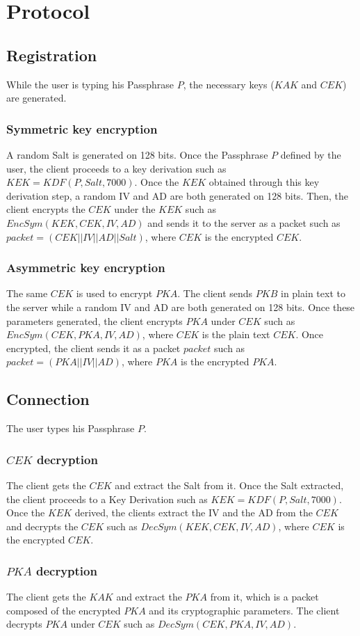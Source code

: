 \documentclass[a4paper,10pt]{article}
\begin{document}
\section{Protocol}
\subsection{Registration}
While the user is typing his Passphrase $P$, the necessary keys ($KAK$ and $CEK$) are generated.
\subsubsection{Symmetric key encryption}
A random Salt is generated on 128 bits. Once the Passphrase $P$ defined by the user, the client proceeds to a key derivation such as $KEK=KDF(P,Salt, 7000)$. Once the $KEK$ obtained through this key derivation step, a random IV and AD are both generated on 128 bits. Then, the client encrypts the $CEK$ under the $KEK$ such as $EncSym(KEK, CEK,IV,AD)$ and sends it to the server as a packet such as $packet=(CEK||IV||AD||Salt)$, where $CEK$ is the encrypted $CEK$.
\subsubsection{Asymmetric key encryption}
The same $CEK$ is used to encrypt $PKA$. The client sends $PKB$ in plain text to the server while a random IV and AD are both generated on 128 bits. Once these parameters generated, the client encrypts $PKA$ under $CEK$ such as $EncSym(CEK, PKA, IV, AD)$, where $CEK$ is the plain text $CEK$. Once encrypted, the client sends it as a packet $packet$ such as $packet=(PKA||IV||AD)$, where $PKA$ is the encrypted $PKA$.

\subsection{Connection}
The user types his Passphrase $P$.

\subsubsection{$CEK$ decryption}
The client gets the $CEK$ and extract the Salt from it. Once the Salt extracted, the client proceeds to a Key Derivation such as $KEK=KDF(P,Salt,7000)$. Once the $KEK$ derived, the clients extract the IV and the AD from the $CEK$ and decrypts the $CEK$ such as $DecSym(KEK,CEK,IV,AD)$, where $CEK$ is the encrypted $CEK$.
\subsubsection{$PKA$ decryption}
The client gets the $KAK$ and extract the $PKA$ from it, which is a packet composed of the encrypted $PKA$ and its cryptographic parameters. The client decrypts $PKA$ under $CEK$ such as $DecSym(CEK, PKA, IV,AD)$.
\end{document}
